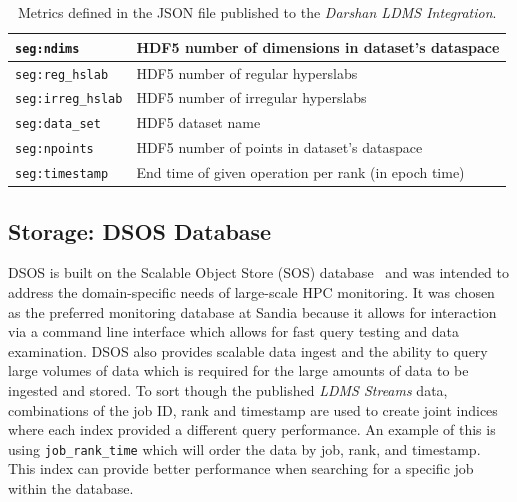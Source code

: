 \begin{table}[h]
{\begin{tabular}{|l|l|}
	\texttt{seg:ndims} & HDF5 number of dimensions in dataset's dataspace\\ \hline
	\texttt{seg:reg\_hslab} & HDF5 number of regular hyperslabs\\ \hline
        \texttt{seg:irreg\_hslab} & HDF5 number of irregular hyperslabs\\ \hline
	\texttt{seg:data\_set} & HDF5 dataset name\\ \hline
	\texttt{seg:npoints} & HDF5 number of points in dataset's dataspace\\ \hline
        \texttt{seg:timestamp} & End time of given operation per rank (in epoch time)\\ \hline          
	\end{tabular}}
	\caption{Metrics defined in the JSON file published to the \emph{Darshan LDMS Integration}.}
	\label{table:metrics}
      \end{table}

\subsection{Storage: DSOS Database}
DSOS is built on the Scalable Object Store (SOS) database~\cite{sosgithub} and was 
intended to address the domain-specific needs of large-scale HPC monitoring. It was 
chosen as the preferred monitoring database at Sandia because it allows for interaction 
via a command line interface which allows for fast query testing and data examination. 
DSOS also provides scalable data ingest and the ability to query large volumes of data 
which is required for the large amounts of data to be ingested and stored. 
To sort though the published \emph{LDMS Streams} data, combinations of the job ID, rank 
and timestamp are used to create joint indices where each index provided a different 
query performance. An example of this is using \texttt{job\_rank\_time} which will 
order the data by job, rank, and timestamp. This index can provide better performance 
when searching for a specific job within the database.

